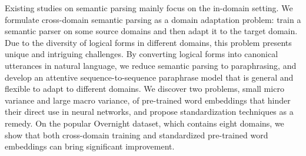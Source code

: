 Existing studies on semantic parsing mainly focus on the in-domain setting. We formulate cross-domain semantic parsing as a domain adaptation problem: train a semantic parser on some source domains and then adapt it to the target domain. Due to the diversity of logical forms in different domains, this problem presents unique and intriguing challenges. By converting logical forms into canonical utterances in natural language, we reduce semantic parsing to paraphrasing, and develop an attentive sequence-to-sequence paraphrase model that is general and flexible to adapt to different domains. We discover two problems, small micro variance and large macro variance, of pre-trained word embeddings that hinder their direct use in neural networks, and propose standardization techniques as a remedy. On the popular Overnight dataset, which contains eight domains, we show that both cross-domain training and standardized pre-trained word embeddings can bring significant improvement.
